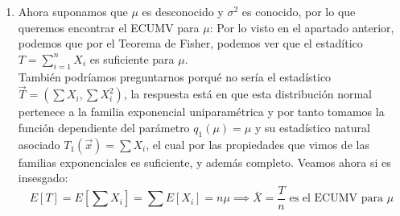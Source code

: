 {\begin{enumerate}
          la familia exponencial uniparamétrica. Entonces sabemos que los estadísticos
          naturales asociados a las funciónes paramétricas $q_i(\theta)$ son completos,
          si éstas ultimas contienen un abierto en su imagen. En este caso, $q_1(\mu,
            \sigma^2) = \mu$ y $q_2(\mu, \sigma^2) = \frac{1}{2\sigma^2}$ contienen un
          abierto en su imagen, por lo que $T$ es completo para $(\mu, \sigma^2)$. \\
          Veamos la esperanza de $T$: $$E[T] = E[(\sum X_i, \sum X_i^2)] = (\sum E[X_i],
            \sum E[X_i^2]) = (n\mu, n\sigma^2 + n\mu^2)$$ $$\implies \frac{\sum X_i}{n} =
            \bar{X} \text{ es el ECUMV para } \mu \text{ y } S^2 = \frac{1}{n-1}\sum_{i =
              1}^{n}(X_i - \bar{X})^2 \text{ es el ECUMV para } \sigma^2$$
    \item Ahora suponamos que $\mu$ es desconocido y $\sigma^2$ es conocido, por lo que
          queremos encontrar el ECUMV para $\mu$: Por lo visto en el apartado anterior,
          podemos que por el Teorema de Fisher, podemos ver que el estadítico $T =
            \sum_{i = 1}^{n} X_i$ es suficiente para $\mu$. \\También podríamos
          preguntarnos porqué no sería el estadístico $\vec{T} = (\sum X_i, \sum X_i^2)$,
          la respuesta está en que esta distribución normal pertenece a la familia
          exponencial uniparamétrica y por tanto tomamos la función dependiente del
          parámetro $q_1(\mu) = \mu$ y su estadístico natural asociado $T_1(\vec{x}) =
            \sum X_i$, el cual por las propiedades que vimos de las familias exponenciales
          es suficiente, y además completo. Veamos ahora si es insesgado: $$E[T] = E[\sum
                X_i] = \sum E[X_i] = n\mu \implies \bar{X} = \frac{T}{n} \text{ es el ECUMV
              para } \mu$$
  \end{enumerate}
}

